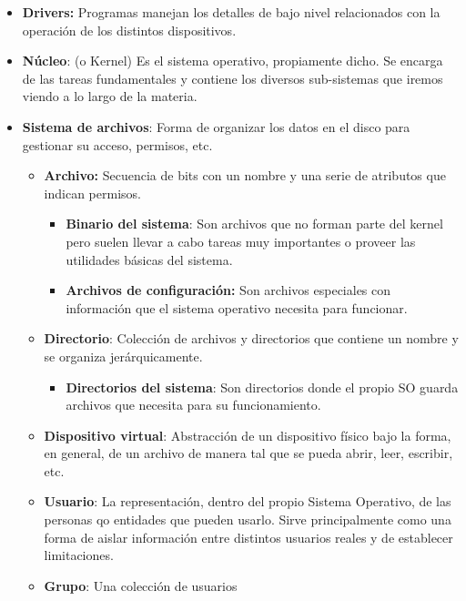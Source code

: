 \begin{itemize}
	\item \textbf{Drivers:} Programas manejan los detalles de bajo nivel relacionados con la operación de los distintos dispositivos.
	\item \textbf{Núcleo}: (o Kernel) Es el sistema operativo, propiamente dicho. Se encarga de las tareas fundamentales y contiene los diversos sub-sistemas que iremos viendo a lo largo de la materia.
	\item\textbf{Sistema de archivos}: Forma de organizar los datos en el disco para gestionar su acceso, permisos, etc.
	\begin{itemize}
		\item \textbf{Archivo:} Secuencia de bits con un nombre y una serie de atributos que indican permisos.
		\begin{itemize}
			\item\textbf{Binario del sistema}: Son archivos que no forman parte del kernel pero suelen llevar a cabo tareas muy importantes o proveer las utilidades básicas del sistema.
			\item \textbf{Archivos de configuración:} Son archivos especiales con información que el sistema operativo necesita para funcionar.
		\end{itemize}
		
		\item \textbf{Directorio}: Colección de archivos y directorios que contiene un nombre y se organiza jerárquicamente.
		\begin{itemize}
			\item\textbf{Directorios del sistema}: Son directorios donde el propio SO guarda archivos que necesita para su funcionamiento.
		\end{itemize}
		\item \textbf{Dispositivo virtual}: Abstracción de un dispositivo físico bajo la forma, en general, de un archivo de manera tal que se pueda abrir, leer, escribir, etc.
		
		\item \textbf{Usuario}: La representación, dentro del propio Sistema Operativo, de las personas qo entidades que pueden usarlo. Sirve principalmente como una forma de aislar información entre distintos usuarios reales y de establecer limitaciones.
		
		\item \textbf{Grupo}: Una colección de usuarios
	\end{itemize}
\end{itemize}

